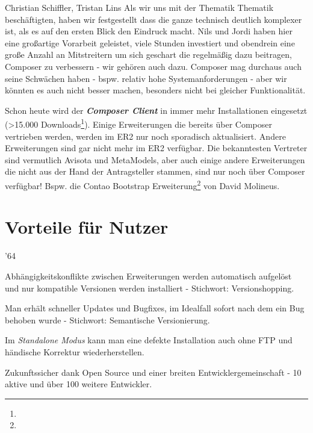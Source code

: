 \documentclass[
paper=a4,
draft=false,%
fontsize=10pt%
]{scrartcl}
\newcommand{\composerClient}{\textbf{\textit{Composer Client}}}
\begin{document}
\begin{emquote}{Christian Schiffler, Tristan Lins}
Als wir uns mit der Thematik Thematik  beschäftigten, haben wir festgestellt dass die ganze technisch deutlich komplexer ist, als es auf den ersten Blick den Eindruck macht. Nils und Jordi haben hier eine großartige Vorarbeit geleistet, viele Stunden investiert und obendrein eine große Anzahl an Mitstreitern um sich geschart die regelmäßig dazu beitragen, Composer zu verbessern - wir gehören auch dazu. Composer mag durchaus auch seine Schwächen haben - bspw. relativ hohe Systemanforderungen - aber wir könnten es auch nicht besser machen, besonders nicht bei gleicher Funktionalität.
\end{emquote}

Schon heute wird der \composerClient{} in immer mehr Installationen eingesetzt (>15.000 Downloads\footnote{}). Einige Erweiterungen die bereits über Composer vertrieben werden, werden im ER2 nur noch sporadisch aktualisiert. Andere Erweiterungen sind gar nicht mehr im ER2 verfügbar. Die bekanntesten Vertreter sind vermutlich Avisota und MetaModels, aber auch einige andere Erweiterungen die nicht aus der Hand der Antragsteller stammen, sind nur noch über Composer verfügbar! Bspw. die Contao Bootstrap Erweiterung\footnote{} von David Molineus.

\newpage

%
%

\section{Vorteile für Nutzer}
\label{sec:pros-for-users}

\begin{minipage}{.02\linewidth}
\end{minipage}
\begin{minipage}{.98\linewidth}
  \begin{dinglist}{'64}
  \item Abhängigkeitskonflikte zwischen Erweiterungen werden automatisch aufgelöst und nur kompatible Versionen werden installiert - Stichwort: Versionshopping\footnotemark.
  \item Man erhält schneller Updates und Bugfixes, im Idealfall sofort nach dem ein Bug behoben wurde - Stichwort: Semantische Versionierung\footnotemark.
  \item Im \textit{Standalone Modus} kann man eine defekte Installation auch ohne FTP und händische Korrektur wiederherstellen.
  \item Zukunftssicher dank Open Source und einer breiten Entwicklergemeinschaft - 10 aktive und über 100 weitere Entwickler.
  \end{dinglist}
\end{minipage}
\end{document}
